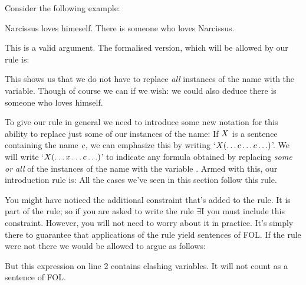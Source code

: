 \bigskip
Consider the following example:
\begin{earg}
\prem Narcissus loves himeself.
\conc There is someone who loves Narcissus.
\end{earg}This is a valid argument. The formalised version, which will be allowed by our rule is:
\begin{pf}
	 
\end{pf} This shows us that we do not have to replace \emph{all} instances of the name with the variable. Though of course we can if we wish: we could also deduce there is someone who loves himself.

To give our rule in general we need to introduce some new notation for this ability to replace just some of our instances of the name: If $X$ is a sentence containing the name $c$, we can emphasize this by writing `$X(\ldots c \ldots c\ldots)$'. We will write `$X(\ldots x \ldots c\ldots)$' to indicate any formula obtained by replacing \emph{some or all} of the instances of the name  with the variable . Armed with this, our introduction rule is:
All the cases we've seen in this section follow this rule.

You might have noticed the additional constraint that's added to the rule. It is {part} of the rule; so if you are asked to write the rule $\exists$I  you {must} include this constraint. However, you will not need to worry about it in practice. It's simply there to guarantee that applications of the rule yield sentences of FOL. If the rule were not there we would be allowed to argue as follows:
\begin{pf}
\end{pf}But this expression on line 2 contains clashing variables. It will not count as a sentence of FOL.



